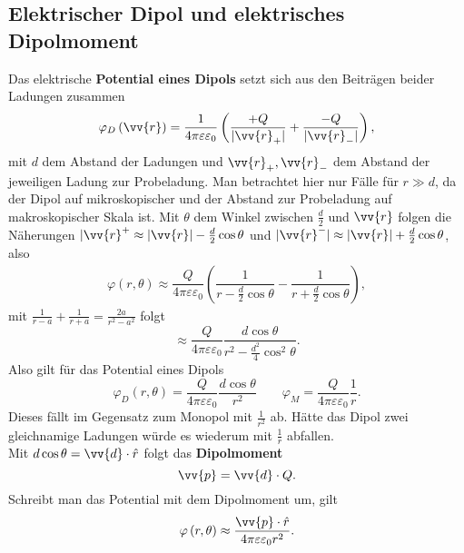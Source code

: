 \documentclass[a4paper,12pt]{article}
\begin{document}
\subsection{Elektrischer Dipol und elektrisches Dipolmoment}
Das elektrische \textbf{Potential eines Dipols} setzt sich aus den Beiträgen beider Ladungen zusammen
\[ 
        \varphi _D\left(\vv{r}\right)=\dfrac{1}{4\pi \varepsilon \varepsilon _0}\left(\dfrac{+Q}{|\vv{r}_+|}+\dfrac{-Q}{|\vv{r}_-|}\right)
,\] 
mit $d$ dem Abstand der Ladungen und $\vv{r}_+,\vv{r}_-$ dem Abstand der jeweiligen Ladung zur Probeladung. Man betrachtet hier nur Fälle für $r\gg d$, da der Dipol auf mikroskopischer und der Abstand zur Probeladung auf makroskopischer Skala ist. Mit $\theta $ dem Winkel zwischen $\tfrac{d}{2}$ und $\vv{r}$ folgen die Näherungen $|\vv{r}^+\approx |\vv{r}|-\tfrac{d}{2}\cos \theta $ und $|\vv{r}^-|\approx |\vv{r}|+\tfrac{d}{2}\cos \theta $, also
\begin{align*}
        \varphi \left(r,\theta \right)\approx \dfrac{Q}{4\pi \varepsilon \varepsilon _0}\left(\dfrac{1}{r-\tfrac{d}{2}\cos \theta  }-\dfrac{1}{r+\tfrac{d}{2}\cos \theta }\right)
,\end{align*}
mit $\tfrac{1}{r-a}+\tfrac{1}{r+a}=\tfrac{2a}{r^2-a^2}$ folgt
\[ 
        \approx \dfrac{Q}{4\pi \varepsilon \varepsilon _0}\dfrac{d\cos \theta }{r^2-\tfrac{d^2}{4}\cos ^2\theta }
.\] 
Also gilt für das Potential eines Dipols
\[ 
        \varphi _D\left(r,\theta \right)=\dfrac{Q}{4\pi \varepsilon \varepsilon _0}\dfrac{d\cos \theta }{r^2}\qquad \varphi _M=\dfrac{Q}{4\pi \varepsilon \varepsilon _0}\dfrac{1}{r}
.\] 
Dieses fällt im Gegensatz zum Monopol mit $\tfrac{1}{r^2}$ ab. Hätte das Dipol zwei gleichnamige Ladungen würde es wiederum mit $\tfrac{1}{r}$ abfallen.\\\indent
Mit $d\cos \theta =\vv{d}\cdot \hat{r}$ folgt das \textbf{Dipolmoment} 
\[ 
        \vv{p}=\vv{d}\cdot Q
.\] 
Schreibt man das Potential mit dem Dipolmoment um, gilt
\[ 
        \varphi \left(r,\theta \right)\approx \dfrac{\vv{p}\cdot \hat{r}}{4\pi \varepsilon \varepsilon _0r^2}
.\] 
\end{document}
